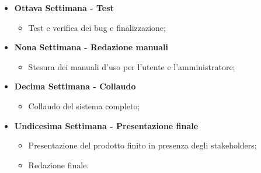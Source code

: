 {\begin{itemize}
\begin{itemize}
            \item Ottimizzazione dell'interfaccia grafica con particolare attenzione all'uso multi-piattaforma;
            \item Test e verifiche finali;
        \end{itemize}
        \item \textbf{Ottava Settimana - Test} 
        \begin{itemize}
            \item Test e verifica dei bug e finalizzazione;
        \end{itemize}
        \item \textbf{Nona Settimana - Redazione manuali} 
        \begin{itemize}
            \item Stesura dei manuali d'uso per l'utente e l'amministratore;
        \end{itemize}
        \item \textbf{Decima Settimana - Collaudo} 
        \begin{itemize}
            \item Collaudo del sistema completo;
        \end{itemize}
        \item \textbf{Undicesima Settimana - Presentazione finale} 
        \begin{itemize}
            \item Presentazione del prodotto finito in presenza degli stakeholders;
            \item Redazione finale.
        \end{itemize}
    \end{itemize}
}

\newcommand{\totaleOre}{308}

\newcommand{\obiettiviObbligatori}{
	 \item \underline{\textit{O01}}: Integrazione di un sistema completo per l'apertura di serrature con lettura di codice a barre e NFC;
	 \item \underline{\textit{O02}}: Realizzazione della piattaforma web per la gestione degli accessi;
	 \item \underline{\textit{O03}}: Creazione del modello 3D dell'involucro e sua realizzazione con stampa 3D;
	 \item \underline{\textit{O04}}: Redazione della manualistica completa;
	 
}

\newcommand{\obiettiviDesiderabili}{
	 \item \underline{\textit{D01}}: Cura e definizione dell'interfaccia grafica della piattaforma web;
	 \item \underline{\textit{D02}}: Ottimizzazione del sistema esistente in termini di efficienza e prestazioni;
}

\newcommand{\obiettiviFacoltativi}{
	 \item \underline{\textit{F01}}: Creazione di un modello 3D modulare espandibile per future versioni;
}